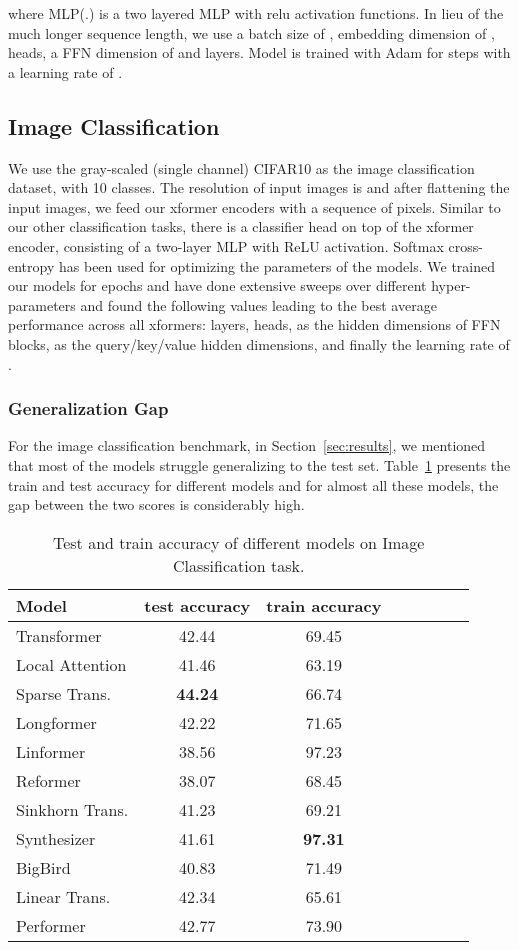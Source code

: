 \documentclass{article} \usepackage{iclr2021_conference,times}
\begin{document}
where MLP(.) is a two layered MLP with relu activation functions. In lieu of the much longer sequence length, we use a batch size of , embedding dimension of ,  heads, a FFN dimension of  and  layers. Model is trained with Adam for  steps with a learning rate of .


\subsection{Image Classification}
We use the gray-scaled (single channel) CIFAR10 as the image classification dataset, with 10 classes. The resolution of input images is  and after flattening the input images, we feed our xformer encoders with a sequence of  pixels. Similar to our other classification tasks, there is a classifier head on top of the xformer encoder, consisting of a two-layer  MLP with ReLU activation.  Softmax cross-entropy has been used for optimizing the parameters of the models. We trained our models for  epochs and have done extensive sweeps over different hyper-parameters and found the following values leading to the best average performance across all xformers:  layers,  heads,  as the hidden dimensions of FFN blocks,  as the query/key/value hidden dimensions, and finally the learning rate of .



\subsubsection{Generalization Gap}
For the image classification benchmark, in Section~\ref{sec:results}, we mentioned that most of the models struggle generalizing to the test set. Table~\ref{tab:image_classification} presents the train and test accuracy for different models and for almost all these models, the gap between the two scores is considerably high.    
\begin{table}[h!]
    \centering
    \begin{tabular}{l|cccccc|c|}
    \toprule
      Model &  test accuracy  & train accuracy \\
    \midrule
        Transformer &  42.44 & 69.45 \\
        Local Attention & 41.46 & 63.19 \\
        Sparse Trans. & \textbf{44.24} &  66.74\\
        Longformer& 42.22 & 71.65\\
        Linformer & 38.56 &  97.23\\
        Reformer & 38.07 &  68.45 & \\
        Sinkhorn Trans. & 41.23 & 69.21\\
        Synthesizer & 41.61 & \textbf{97.31}\\
        BigBird  & 40.83 & 71.49\\
        Linear Trans. & 42.34 & 65.61\\ 
        Performer  & 42.77  & 73.90 \\
     \bottomrule
    \end{tabular}
    \caption{Test and train accuracy of different models on Image Classification task.}
    \label{tab:image_classification}
\end{table}
\end{document}

